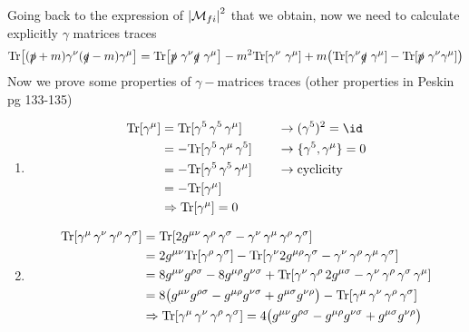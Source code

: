 \documentclass[TheoreticalPhy_ModB.tex]{subfiles}
\begin{document}
\skipline
Going back to the expression of $\left\lvert \mathcal{M}_{fi} \right\rvert^2$ that we obtain, now we need to calculate explicitly $\gamma$ matrices traces
\[
\textup{Tr} \bigl[ (\slashed p + m) \gamma^{\nu} (\slashed q - m) \gamma^{\mu} \bigr] =
\textup{Tr} \bigl[ \slashed p \ \gamma^{\nu} \slashed q \ \gamma^{\mu} \bigr] - m^2 \textup{Tr} [\gamma^{\nu} \ \gamma^{\mu} ] +
m \bigl( \textup{Tr} [\gamma^{\nu} \slashed q \ \gamma^{\mu} ] - \textup{Tr} [ \slashed p \ \gamma^{\nu} \gamma^{\mu}] \bigr)
\]
Now we prove some properties of $\gamma-$matrices traces (\textsf{other properties in Peskin pg 133-135})
\begin{enumerate}[label=(\Roman*)]
\item 
	\begin{alignat*}{2}
	\Tr [\gamma^{\mu}] 	& = \Tr[\gamma^5 \, \gamma^5 \, \gamma^{\mu} ]		&\quad & \to (\gamma^5)^2 = \id \\
						& = - \Tr [ \gamma^5 \, \gamma^{\mu} \, \gamma^5 ]	&& \to \{ \gamma^5, \gamma^{\mu} \} = 0 \\
						& = - \Tr [ \gamma^5 \, \gamma^5 \, \gamma^{\mu} ] 	&& \to \textup{cyclicity} \\
						& = -\Tr[\gamma^{\mu}] 							&& \\
						& \so \Tr [\gamma^{\mu}] = 0						&&						
	\end{alignat*}
\item
	\begin{align*}
	\textup{Tr} [\gamma^{\mu} \, \gamma^{\nu} \, \gamma^{\rho} \, \gamma^{\sigma}]
	&= \textup{Tr} [2g^{\mu\nu} \, \gamma^{\rho}\, \gamma^{\sigma} - \gamma^{\nu}\, \gamma^{\mu}\, \gamma^{\rho}\, \gamma^{\sigma} ] \\
	& = 2g^{\mu\nu} \textup{Tr}[ \gamma^{\rho}\, \gamma^{\sigma}] - \textup{Tr}[\gamma^{\nu}2g^{\mu\rho}\gamma^{\sigma}
		- \gamma^{\nu}\, \gamma^{\rho}\, \gamma^{\mu}\, \gamma^{\sigma}] \\
	& = 8g^{\mu\nu}g^{\rho\sigma} - 8g^{\mu\rho}g^{\nu\sigma} +
		\textup{Tr}[\gamma^{\nu}\, \gamma^{\rho}\, 2g^{\mu\sigma} - \gamma^{\nu}\, \gamma^{\rho}\, \gamma^{\sigma}\, \gamma^{\mu}] \\
	& = 8 \bigl( g^{\mu\nu}g^{\rho\sigma} - g^{\mu\rho}g^{\nu\sigma} + g^{\mu\sigma}g^{\nu\rho} \bigr)
		-\textup{Tr}[\gamma^{\mu}\, \gamma^{\nu}\, \gamma^{\rho}\, \gamma^{\sigma}] \\
	& \Rightarrow \textup{Tr}[\gamma^{\mu}\, \gamma^{\nu}\, \gamma^{\rho}\, \gamma^{\sigma}] =
		4\bigl( g^{\mu\nu}g^{\rho\sigma} - g^{\mu\rho}g^{\nu\sigma} + g^{\mu\sigma}g^{\nu\rho} \bigr)
	\end{align*}
\end{enumerate}
\end{document}
